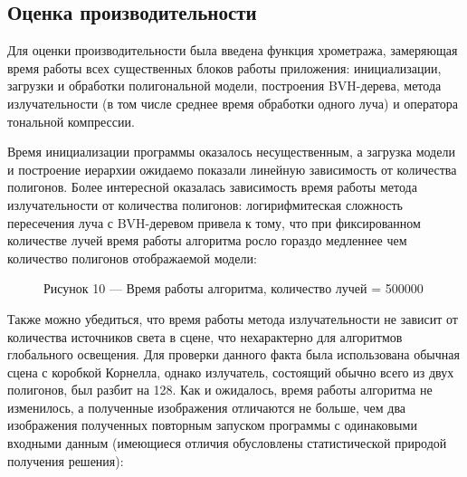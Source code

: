 \documentclass[12pt]{article}
\begin{document}
\subsection{Оценка производительности}
Для оценки производительности была введена функция хрометража, замеряющая время работы всех существенных блоков работы приложения: инициализации, загрузки и обработки полигональной модели, построения BVH-дерева, метода излучательности (в том числе среднее время обработки одного луча) и оператора тональной компрессии.

Время инициализации программы оказалось несущественным, а загрузка модели и построение иерархии ожидаемо показали линейную зависимость от количества полигонов. Более интересной оказалась зависимость время работы метода излучательности от количества полигонов:  логирифмитеская сложность пересечения луча с BVH-деревом привела к тому, что при фиксированном количестве лучей время работы алгоритма росло гораздо медленнее чем количество полигонов отображаемой модели:

\begin{figure}[h]
\centering
{}
\caption*{Рисунок 10 --- Время работы алгоритма, количество лучей = 500000}
\end{figure}

Также можно убедиться, что время работы метода излучательности не зависит от количества источников света в сцене, что нехарактерно для алгоритмов глобального освещения. Для проверки данного факта была использована обычная сцена с коробкой Корнелла, однако излучатель, состоящий обычно всего из двух полигонов, был разбит на 128. Как и ожидалось, время работы алгоритма не изменилось, а полученные изображения отличаются не больше, чем два изображения полученных повторным запуском программы с одинаковыми входными данным (имеющиеся отличия обусловлены статистической природой получения решения):
\end{document}

